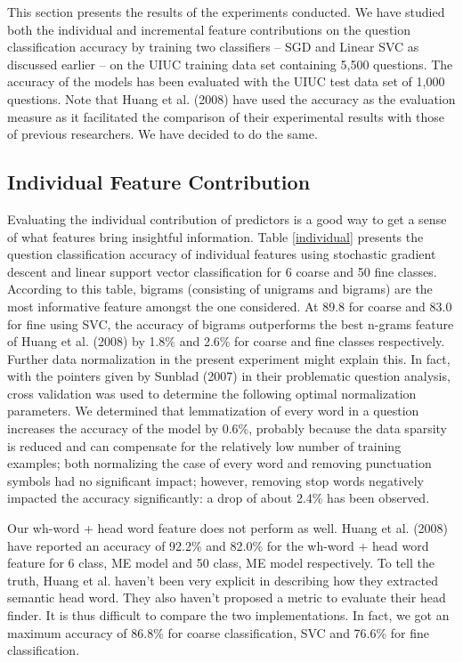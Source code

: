 \documentclass[11pt]{article}
\begin{document}
This section presents the results of the experiments conducted. We have studied both the individual and incremental feature contributions on the question classification accuracy by training two classifiers -- SGD and Linear SVC as discussed earlier -- on the UIUC training data set containing 5,500 questions. The accuracy of the models has been evaluated with the UIUC test data set of 1,000 questions. Note that Huang et al. (2008) have used the accuracy as the evaluation measure as it facilitated the comparison of their experimental results with those of previous researchers. We have decided to do the same.

\subsection{Individual Feature Contribution}

Evaluating the individual contribution of predictors is a good way to get a sense of what features bring insightful information. Table \ref{individual} presents the question classification accuracy of individual features using stochastic gradient descent and linear support vector classification for 6 coarse and 50 fine classes. According to this table, bigrams (consisting of unigrams and bigrams) are the most informative feature amongst the one considered. At 89.8 for coarse and 83.0 for fine using SVC, the accuracy of bigrams  outperforms the best n-grams feature of Huang et al. (2008) by 1.8\% and 2.6\% for coarse and fine classes respectively. Further data normalization in the present experiment might explain this. In fact, with the pointers given by Sunblad (2007) in their problematic question analysis, cross validation was used to determine the following optimal normalization parameters. We determined that lemmatization of every word in a question increases the accuracy of the model by 0.6\%, probably because the data sparsity is reduced and can compensate for the relatively low number of training examples; both normalizing the case of every word and removing punctuation symbols had no significant impact; however, removing stop words negatively impacted the accuracy significantly: a drop of about 2.4\% has been observed.

Our wh-word + head word feature does not perform as well. Huang et al. (2008) have reported an accuracy of 92.2\% and 82.0\% for the wh-word + head word feature  for 6 class, ME model and 50 class, ME model respectively. To tell the truth, Huang et al. haven't been very explicit in describing how they extracted semantic head word. They also haven't proposed a metric to evaluate their head finder. It is thus difficult to compare the two implementations. In fact, we got an maximum accuracy of 86.8\% for coarse classification, SVC and 76.6\% for fine classification. 
\end{document}
